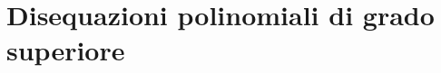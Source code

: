 % 
% 
%  
% 
% 


\section{Disequazioni polinomiali di grado superiore}
\label{sec:diseq_grado_superiore}


